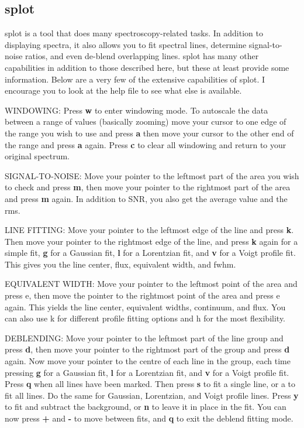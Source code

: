 \subsection{{\bf splot}}
splot is a tool that does many spectroscopy-related tasks. In addition to displaying spectra, it also allows you to fit spectral lines, determine signal-to-noise ratios, and even de-blend overlapping lines. splot has many other capabilities in addition to those described here, but these at least provide some information. Below are a very few of the extensive capabilities of splot. I encourage you to look at the help file to see what else is available.

WINDOWING: Press {\bf w} to enter windowing mode. To autoscale the data between a range of values (basically zooming) move your cursor to one edge of the range you wish to use and press {\bf a} then move your cursor to the other end of the range and press {\bf a} again. Press {\bf c} to clear all windowing and return to your original spectrum.

SIGNAL-TO-NOISE: Move your pointer to the leftmost part of the area you wish to check and press {\bf m}, then move your pointer to the rightmost part of the area and press {\bf m} again. In addition to SNR, you also get the average value and the rms.

LINE FITTING: Move your pointer to the leftmost edge of the line and press {\bf k}. Then move your pointer to the rightmost edge of the line, and press {\bf k} again for a simple fit, {\bf g} for a Gaussian fit, {\bf l} for a Lorentzian fit, and {\bf v} for a Voigt profile fit. This gives you the line center, flux, equivalent width, and fwhm.

EQUIVALENT WIDTH: Move your pointer to the leftmost point of the area and press e, then move the pointer to the rightmost point of the area and press e again. This yields the line center, equivalent widths, continuum, and flux. You can also use k for different profile fitting options and h for the most flexibility.

DEBLENDING: Move your pointer to the leftmost part of the line group and press {\bf d}, then move your pointer to the rightmost part of the group and press {\bf d} again. Now move your pointer to the centre of each line in the group, each time pressing {\bf g} for a Gaussian fit, {\bf l} for a Lorentzian fit, and {\bf v} for a Voigt profile fit. Press {\bf q} when all lines have been marked. Then press {\bf s} to fit a single line, or a to fit all lines. Do the same for Gaussian, Lorentzian, and Voigt profile lines. Press {\bf y} to fit and subtract the background, or {\bf n} to leave it in place in the fit. You can now press {\bf +} and {\bf -} to move between fits, and {\bf q} to exit the deblend fitting mode.


